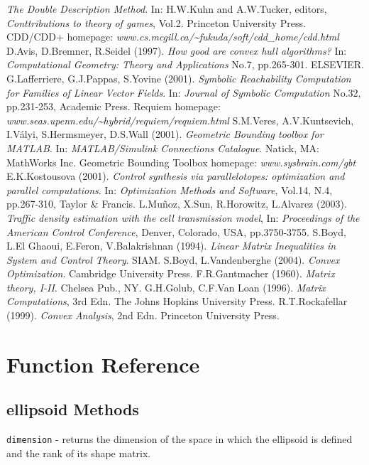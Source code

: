 \documentclass{report}
\begin{document}
\begin{thebibliography}{XX}
{\it The Double Description Method}. In: H.W.Kuhn and A.W.Tucker, editors,
{\it Conttributions to theory of games}, Vol.2. Princeton University Press.
 CDD/CDD+ homepage:
{\it www.cs.mcgill.ca/\~{ }fukuda/soft/cdd\_home/cdd.html}
 D.Avis, D.Bremner, R.Seidel (1997). {\it How good are convex
hull algorithms?} In: {\it Computational Geometry: Theory and Applications}
No.7, pp.265-301. ELSEVIER.
 G.Lafferriere, G.J.Pappas, S.Yovine (2001). {\it Symbolic
Reachability Computation for Families of Linear Vector Fields}. In:
{\it Journal of Symbolic Computation} No.32, pp.231-253, Academic Press.
 Requiem homepage:
{\it www.seas.upenn.edu/\~{ }hybrid/requiem/requiem.html}
 S.M.Veres, A.V.Kuntsevich, I.V\'{a}lyi, S.Hermsmeyer,
D.S.Wall (2001). {\it Geometric Bounding toolbox for MATLAB}. In:
{\it MATLAB/Simulink Connections Catalogue}. Natick, MA: MathWorks Inc.
 Geometric Bounding Toolbox homepage:
{\it www.sysbrain.com/gbt}
 E.K.Kostousova (2001). {\it Control synthesis via
parallelotopes: optimization and parallel computations}.
In: {\it Optimization Methods and Software}, Vol.14, N.4, pp.267-310,
Taylor \& Francis.
 L.Mu\~{n}oz, X.Sun, R.Horowitz, L.Alvarez (2003).
{\it Traffic density estimation with the cell transmission model},
In: {\it Proceedings of the American Control Conference},
Denver, Colorado, USA, pp.3750-3755.
 S.Boyd, L.El Ghaoui, E.Feron, V.Balakrishnan (1994).
{\it Linear Matrix Inequalities in System and Control Theory}. SIAM.
 S.Boyd, L.Vandenberghe (2004).
{\it Convex Optimization}. Cambridge University Press.
 F.R.Gantmacher (1960). {\it Matrix theory, I-II}.
Chelsea Pub., NY.
 G.H.Golub, C.F.Van Loan (1996). {\it Matrix Computations},
3rd Edn. The Johns Hopkins University Press.
 R.T.Rockafellar (1999). {\it Convex Analysis}, 2nd Edn.
Princeton University Press.
\end{thebibliography}





\appendix
\chapter{Function Reference}
\section{ellipsoid Methods}
{\Large {\tt dimension}} - returns the dimension of the space in which
the ellipsoid is defined and the rank of its shape matrix.
\end{document}
